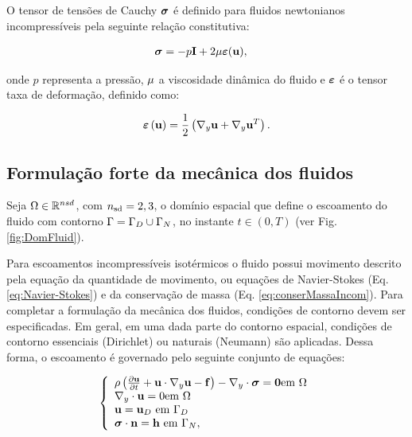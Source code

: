 \documentclass[tese_patricia]{subfiles}%
\begin{document}
O tensor de tensões de Cauchy $\boldsymbol{\sigma}$ é definido para fluidos newtonianos incompressíveis pela seguinte relação constitutiva:

\begin{align}
\boldsymbol{\sigma} &= -p\mathbf{I} + 2\mu\bm{\varepsilon}(\mathbf{u}),\label{eq:StressTensor}
\end{align}

\noindent onde $p$ representa a pressão, $\mu$ a viscosidade dinâmica do fluido e $\bm{\varepsilon}$ é o tensor taxa de deformação, definido como:


\begin{align}
\bm{\varepsilon}\left(\mathbf{u}\right) = \frac{1}{2}\left(\nabla_y\mathbf{u} + \nabla_y\mathbf{u}^{T}\right). 
\label{eq:StrainTensor}
\end{align}

\subsection{Formulação forte da mecânica dos fluidos}

Seja $\Omega \in \mathbb{R}^{nsd}$, com ${n_{\mathrm{sd}}} = 2,3$, o domínio espacial que define o escoamento do fluido com contorno $\Gamma = \Gamma_D \cup \Gamma_N$, no instante $t \in (0,T)$ (ver Fig. \ref{fig:DomFluid}).

Para escoamentos incompressíveis isotérmicos o fluido possui movimento descrito pela equação da quantidade de movimento, ou equações de Navier-Stokes (Eq. \ref{eq:Navier-Stokes}) e da conservação de massa (Eq. \ref{eq:conserMassaIncom}). Para completar a formulação da mecânica dos fluidos, condições de contorno devem ser especificadas. Em geral, em uma dada parte do contorno espacial, condições de contorno essenciais (Dirichlet) ou naturais (Neumann) são aplicadas. Dessa forma, o escoamento é governado pelo seguinte conjunto de equações:

\begin{equation}
	\left\{
	\begin{array}{l}
		\density\left(\frac{\partial\velocity}{\partial t} + \velocity\cdot\nabla_y\velocity - \sbodyforce \right) - \nabla_y \cdot \stresstensor = \mathbf{0} \textrm{em} \ \domain\\
		\nabla_y \cdot \velocity = 0 \textrm{em} \ \domain\\
		\velocity = \velocityD \ \textrm{em} \ \GammaD \\
		\stresstensor \cdot \snormal = \surfaceLoad \ \textrm{em} \ \GammaN,
	\end{array}
	\right.
\end{equation}
\end{document}

